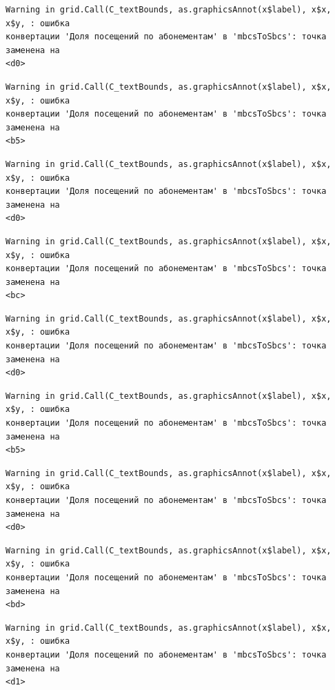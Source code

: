 \documentclass[
  letterpaper,
  DIV=11,
  numbers=noendperiod]{scrreprt}
\begin{document}
\begin{verbatim}
Warning in grid.Call(C_textBounds, as.graphicsAnnot(x$label), x$x, x$y, : ошибка
конвертации 'Доля посещений по абонементам' в 'mbcsToSbcs': точка заменена на
<d0>
\end{verbatim}

\begin{verbatim}
Warning in grid.Call(C_textBounds, as.graphicsAnnot(x$label), x$x, x$y, : ошибка
конвертации 'Доля посещений по абонементам' в 'mbcsToSbcs': точка заменена на
<b5>
\end{verbatim}

\begin{verbatim}
Warning in grid.Call(C_textBounds, as.graphicsAnnot(x$label), x$x, x$y, : ошибка
конвертации 'Доля посещений по абонементам' в 'mbcsToSbcs': точка заменена на
<d0>
\end{verbatim}

\begin{verbatim}
Warning in grid.Call(C_textBounds, as.graphicsAnnot(x$label), x$x, x$y, : ошибка
конвертации 'Доля посещений по абонементам' в 'mbcsToSbcs': точка заменена на
<bc>
\end{verbatim}

\begin{verbatim}
Warning in grid.Call(C_textBounds, as.graphicsAnnot(x$label), x$x, x$y, : ошибка
конвертации 'Доля посещений по абонементам' в 'mbcsToSbcs': точка заменена на
<d0>
\end{verbatim}

\begin{verbatim}
Warning in grid.Call(C_textBounds, as.graphicsAnnot(x$label), x$x, x$y, : ошибка
конвертации 'Доля посещений по абонементам' в 'mbcsToSbcs': точка заменена на
<b5>
\end{verbatim}

\begin{verbatim}
Warning in grid.Call(C_textBounds, as.graphicsAnnot(x$label), x$x, x$y, : ошибка
конвертации 'Доля посещений по абонементам' в 'mbcsToSbcs': точка заменена на
<d0>
\end{verbatim}

\begin{verbatim}
Warning in grid.Call(C_textBounds, as.graphicsAnnot(x$label), x$x, x$y, : ошибка
конвертации 'Доля посещений по абонементам' в 'mbcsToSbcs': точка заменена на
<bd>
\end{verbatim}

\begin{verbatim}
Warning in grid.Call(C_textBounds, as.graphicsAnnot(x$label), x$x, x$y, : ошибка
конвертации 'Доля посещений по абонементам' в 'mbcsToSbcs': точка заменена на
<d1>
\end{verbatim}
\end{document}
